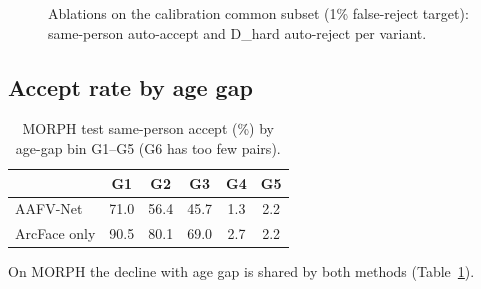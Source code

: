 \documentclass[10pt, a4paper, twocolumn]{article}
\newcommand{\sys}{AAFV-Net}
\begin{document}
\begin{figure}[h]
\centering
{}
\caption{Ablations on the calibration common subset (1\% false-reject target): same-person auto-accept and D\_hard auto-reject per variant.}
\label{fig:abl}
\end{figure}

\subsection{Accept rate by age gap}
\begin{table}[h]
\centering\small
\caption{MORPH test same-person accept (\%) by age-gap bin G1--G5 (G6 has too few pairs).}
\label{tab:gap}
\begin{tabular}{@{}lccccc@{}}
\toprule
 & G1 & G2 & G3 & G4 & G5\\\midrule
\sys & 71.0 & 56.4 & 45.7 & 1.3 & 2.2\\
ArcFace only & 90.5 & 80.1 & 69.0 & 2.7 & 2.2\\\bottomrule
\end{tabular}
\end{table}
On MORPH the decline with age gap is shared by both methods (Table~\ref{tab:gap}).
\end{document}
